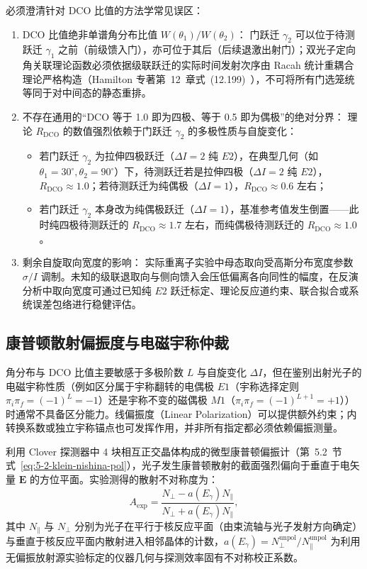 必须澄清针对 DCO 比值的方法学常见误区：
\begin{enumerate}
\item DCO 比值绝非单谱角分布比值 $W(\theta_1)/W(\theta_2)$：
门跃迁 $\gamma_2$ 可以位于待测跃迁 $\gamma_1$ 之前（前级馈入门），亦可位于其后（后续退激出射门）；双光子定向角关联理论函数必须依据级联跃迁的实际时间发射次序由 Racah 统计重耦合理论严格构造（Hamilton 专著第~12~章式~(12.199)~\cite{book-hamilton-electromagnetic-interaction}），不可将所有门选笼统等同于对中间态的静态重排。
\item 不存在通用的“DCO 等于 1.0 即为四极、等于 0.5 即为偶极”的绝对分界：
理论 $R_{\mathrm{DCO}}$ 的数值强烈依赖于门跃迁 $\gamma_2$ 的多极性质与自旋变化：
\begin{itemize}
\item 若门跃迁 $\gamma_2$ 为拉伸四极跃迁（$\Delta I = 2$ 纯 $E2$），在典型几何（如 $\theta_1 = 30^\circ, \theta_2 = 90^\circ$）下，待测跃迁若是拉伸四极（$\Delta I = 2$ 纯 $E2$），$R_{\mathrm{DCO}} \approx 1.0$；若待测跃迁为纯偶极（$\Delta I = 1$），$R_{\mathrm{DCO}} \approx 0.6$ 左右；
\item 若门跃迁 $\gamma_2$ 本身改为纯偶极跃迁（$\Delta I = 1$），基准参考值发生倒置——此时纯四极待测跃迁的 $R_{\mathrm{DCO}} \approx 1.7$ 左右，而纯偶极待测跃迁的 $R_{\mathrm{DCO}} \approx 1.0$。
\end{itemize}
\item 剩余自旋取向宽度的影响：
实际重离子实验中母态取向受高斯分布宽度参数 $\sigma/I$ 调制。未知的级联退取向与侧向馈入会压低偏离各向同性的幅度，在反演分析中取向宽度可通过已知纯 $E2$ 跃迁标定、理论反应道约束、联合拟合或系统误差包络进行稳健评估。
\end{enumerate}

\subsection{康普顿散射偏振度与电磁宇称仲裁}\label{subsec:5-7-4}

角分布与 DCO 比值主要敏感于多极阶数 $L$ 与自旋变化 $\Delta I$，但在鉴别出射光子的电磁宇称性质（例如区分属于宇称翻转的电偶极 $E1$（宇称选择定则 $\pi_i \pi_f = (-1)^L = -1$）还是宇称不变的磁偶极 $M1$（$\pi_i \pi_f = (-1)^{L+1} = +1$））时通常不具备区分能力。线偏振度（Linear Polarization）可以提供额外约束；内转换系数或独立宇称锚点也可发挥作用，并非所有指定都必须依赖偏振测量。

利用 Clover 探测器中 4 块相互正交晶体构成的微型康普顿偏振计（第~5.2~节式~\eqref{eq:5-2-klein-nishina-pol}），光子发生康普顿散射的截面强烈偏向于垂直于电矢量 $\mathbf{E}$ 的方位平面。实验测得的散射不对称度为：
\begin{equation}\label{eq:5-7-asym-exp}
A_{\mathrm{exp}} = \frac{N_\perp - a(E_\gamma) N_\parallel}{N_\perp + a(E_\gamma) N_\parallel},
\end{equation}
其中 $N_\parallel$ 与 $N_\perp$ 分别为光子在平行于核反应平面（由束流轴与光子发射方向确定）与垂直于核反应平面内散射进入相邻晶体的计数，$a(E_\gamma) = N_\perp^{\mathrm{unpol}} / N_\parallel^{\mathrm{unpol}}$ 为利用无偏振放射源实验标定的仪器几何与探测效率固有不对称校正系数。

